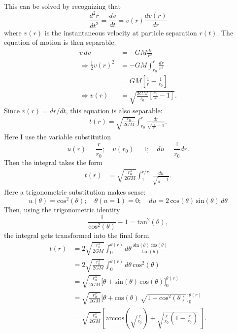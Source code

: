 \documentclass[12pt]{article}
\begin{document}
  This can be solved by recognizing that
  \begin{equation}
    \frac{d^2 r}{dt^2} = \frac{dv}{dt} = v(r) \frac{dv(r)}{dr}
  \end{equation}
  where $v(r)$ is the instantaneous velocity at particle separation $r(t)$. The equation of motion is then separable:
  \begin{align}
    v\, dv &= -GM \frac{dr}{r^2} \\
    \Rightarrow \frac{1}{2}v(r)^2 &= -GM\int_{r_0}^r \frac{dr}{r^2} \\
                                  &= GM\left[ \frac{1}{r} - \frac{1}{r_0} \right] \\
    \Rightarrow v(r) &= \sqrt{\frac{2GM}{r_0} \left[\frac{r_0}{r} - 1\right]}.
  \end{align}
  Since $v(r) = dr / dt$, this equation is also separable:
  \begin{align}
    t(r) = \sqrt{\frac{r_0}{2GM}}\int_{r_0}^r \frac{dr}{\sqrt{\frac{r_0}{r} - 1}}.
  \end{align}
  Here I use the variable substitution
  \begin{equation}
    u(r) = \frac{r}{r_0}; \quad u(r_0) = 1; \quad du = \frac{1}{r_0} dr.
  \end{equation}
  Then the integral takes the form
  \begin{align}
    t(r) &= \sqrt{\frac{r_0^3}{2GM}}\int_{1}^{r/r_0} \frac{du}{\sqrt{\frac{1}{u}-1}}.
  \end{align}
  Here a trigonometric substitution makes sense:
  \begin{equation}
    u(\theta) = \text{cos}^2(\theta); \quad \theta(u = 1) = 0; \quad du = 2\,\text{cos}(\theta)\, \text{sin}(\theta)\, d\theta
  \end{equation}
  Then, using the trigonometric identity
  \[
    \frac{1}{\text{cos}^2(\theta)} - 1 = \text{tan}^2(\theta),
  \]
  the integral gets transformed into the final form
  \begin{align}
    t(r) &= 2\sqrt{\frac{r_0^3}{2GM}} \int_{0}^{\theta(r)} d\theta\, \frac{\text{sin}(\theta)\, \text{cos}(\theta)}{\text{tan}(\theta)} \\
         &= 2\sqrt{\frac{r_0^3}{2GM}} \int_{0}^{\theta(r)} d\theta\, \text{cos}^2(\theta) \\
         &= \sqrt{\frac{r_0^3}{2GM}} \bigg[ \theta + \text{sin}(\theta)\, \text{cos}(\theta) \bigg]_0^{\theta(r)} \\
         &= \sqrt{\frac{r_0^3}{2GM}} \bigg[ \theta + \text{cos}(\theta)\, \sqrt{1 - \text{cos}^2(\theta)} \bigg]_0^{\theta(r)} \\
         &= \sqrt{\frac{r_0^3}{2GM}} \left[ \text{arccos}\left(\sqrt{\frac{r}{r_0}}\right) + \sqrt{\frac{r}{r_0} \left(1 - \frac{r}{r_0}\right)}\ \right].
  \end{align}
\end{document}
